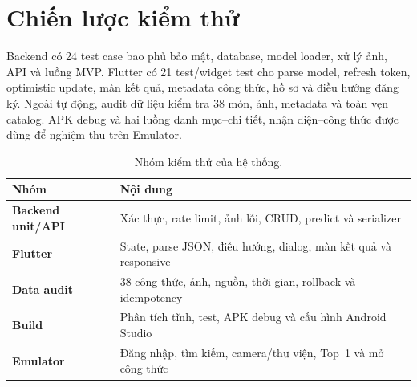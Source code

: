 \section{Chiến lược kiểm thử}

Backend có 24 test case bao phủ bảo mật, database, model loader, xử lý ảnh,
API và luồng MVP. Flutter có 21 test/widget test cho parse model, refresh
token, optimistic update, màn kết quả, metadata công thức, hồ sơ và điều
hướng đăng ký. Ngoài tự động, audit dữ liệu kiểm tra 38 món, ảnh, metadata và
toàn vẹn catalog. APK debug và hai luồng danh mục--chi tiết, nhận diện--công
thức được dùng để nghiệm thu trên Emulator.

\begin{table}[htbp]
\centering
\caption{Nhóm kiểm thử của hệ thống.}
\label{tab:test-groups}
\begin{tabularx}{\textwidth}{>{\bfseries}p{3.2cm} X}
\toprule
Nhóm & Nội dung \\
\midrule
Backend unit/API & Xác thực, rate limit, ảnh lỗi, CRUD, predict và serializer \\
Flutter & State, parse JSON, điều hướng, dialog, màn kết quả và responsive \\
Data audit & 38 công thức, ảnh, nguồn, thời gian, rollback và idempotency \\
Build & Phân tích tĩnh, test, APK debug và cấu hình Android Studio \\
Emulator & Đăng nhập, tìm kiếm, camera/thư viện, Top~1 và mở công thức \\
\bottomrule
\end{tabularx}
\end{table}
